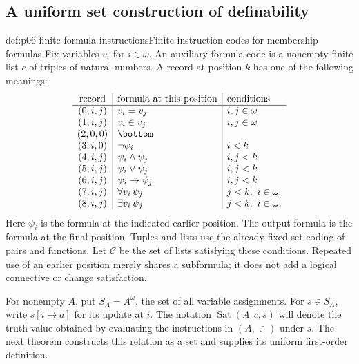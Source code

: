 \subsection{A uniform set construction of definability}

\begin{hbdefinition}{def:p06-finite-formula-instructions}{Finite instruction codes for membership formulas}
Fix variables \(v_i\) for \(i\in\omega\).  An auxiliary formula code
is a nonempty finite list \(c\) of triples of natural numbers.  A
record at position \(k\) has one of the following meanings:
\[
\begin{array}{c|l|l}
\text{record}&\text{formula at this position}&\text{conditions}\\
\hline
(0,i,j)&v_i=v_j&i,j\in\omega\\
(1,i,j)&v_i\in v_j&i,j\in\omega\\
(2,0,0)&\bottom&\\
(3,i,0)&\neg\psi_i&i<k\\
(4,i,j)&\psi_i\land\psi_j&i,j<k\\
(5,i,j)&\psi_i\lor\psi_j&i,j<k\\
(6,i,j)&\psi_i\to\psi_j&i,j<k\\
(7,i,j)&\forall v_i\,\psi_j&j<k,\ i\in\omega\\
(8,i,j)&\exists v_i\,\psi_j&j<k,\ i\in\omega.
\end{array}
\]
Here \(\psi_i\) is the formula at the indicated earlier position.
The output formula is the formula at the final position.  Tuples and
lists use the already fixed set coding of pairs and functions.
Let \(\mathcal C\) be the set of lists satisfying these conditions.
Repeated use of an earlier position merely shares a subformula; it
does not add a logical connective or change satisfaction.

For nonempty \(A\), put \(S_A=A^\omega\), the set of all variable
assignments.  For \(s\in S_A\), write \(s[i\mapsto a]\) for its
update at \(i\).  The notation \(\operatorname{Sat}(A,c,s)\) will
denote the truth value obtained by evaluating the instructions in
\((A,\in)\) under \(s\).  The next theorem constructs this relation
as a set and supplies its uniform first-order definition.
\end{hbdefinition}

